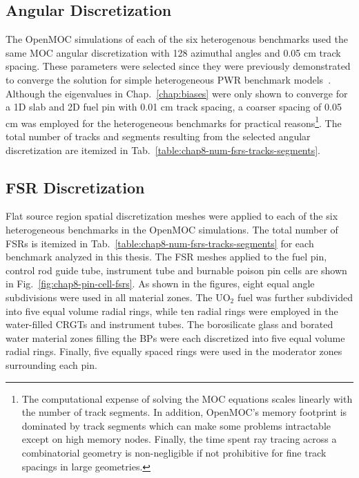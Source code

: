 \subsection{Angular Discretization}
\label{subsec:chap8-angular-discretizations}

The OpenMOC simulations of each of the six heterogenous benchmarks used the same \ac{MOC} angular discretization with 128 azimuthal angles and 0.05 cm track spacing. These parameters were selected since they were previously demonstrated to converge the solution for simple heterogeneous \ac{PWR} benchmark models~\cite{boyd2014ms}. Although the eigenvalues in Chap.~\ref{chap:biases} were only shown to converge for a 1D slab and 2D fuel pin with 0.01 cm track spacing, a coarser spacing of 0.05 cm was employed for the heterogeneous benchmarks for practical reasons\footnote{The computational expense of solving the \ac{MOC} equations scales linearly with the number of track segments. In addition, OpenMOC's memory footprint is dominated by track segments which can make some problems intractable except on high memory nodes. Finally, the time spent ray tracing across a combinatorial geometry is non-negligible if not prohibitive for fine track spacings in large geometries.}. The total number of tracks and segments resulting from the selected angular discretization are itemized in Tab.~\ref{table:chap8-num-fsrs-tracks-segments}. 

\subsection{\ac{FSR} Discretization}
\label{subsec:chap8-fsr-discretizations}

Flat source region spatial discretization meshes were applied to each of the six heterogeneous benchmarks in the OpenMOC simulations. The total number of \ac{FSR}s is itemized in Tab.~\ref{table:chap8-num-fsrs-tracks-segments} for each benchmark analyzed in this thesis. The \ac{FSR} meshes applied to the fuel pin, control rod guide tube, instrument tube and burnable poison pin cells are shown in Fig.~\ref{fig:chap8-pin-cell-fsrs}. As shown in the figures, eight equal angle subdivisions were used in all material zones. The UO$_2$ fuel was further subdivided into five equal volume radial rings, while ten radial rings were employed in the water-filled \acp{CRGT} and instrument tubes. The borosilicate glass and borated water material zones filling the \acp{BP} were each discretized into five equal volume radial rings. Finally, five equally spaced rings were used in the moderator zones surrounding each pin.

